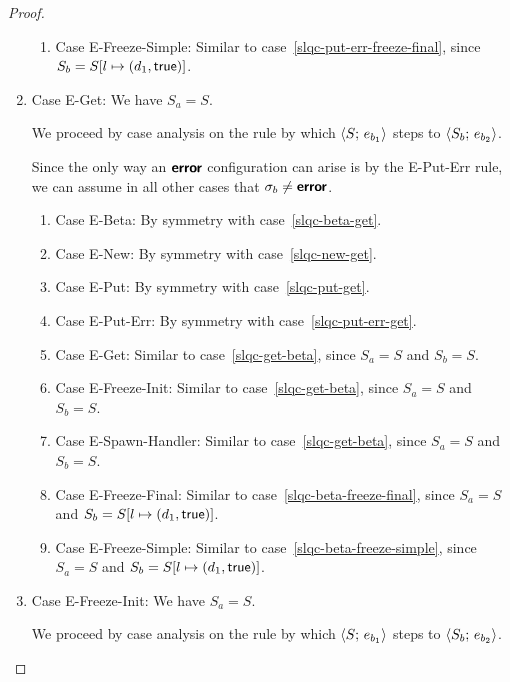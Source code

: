 \begin{proof}
\begin{enumerate}
\begin{enumerate}
    \item \label{slqc-put-err-freeze-simple}Case {\sc
      E-Freeze-Simple}: Similar to
      case~\ref{slqc-put-err-freeze-final}, since $S_b =
      S[l \mapsto (d_1, \textsf{true})]$.

    \end{enumerate}
  \item Case {\sc E-Get}: We have $S_a = S$.

    We proceed by case analysis on the rule by which
    $\langle S;\, e_{b_1} \rangle$ steps to $\langle S_b;\, e_{b_2} \rangle$.

    Since the only way an $\textbf{\textsf{error}}$ configuration can arise is by the
    {\sc E-Put-Err} rule, we can assume in all other cases that
    $\sigma_b \neq \textbf{\textsf{error}}$.
    \begin{enumerate}
    \item \label{slqc-get-beta}Case {\sc E-Beta}: By symmetry with case~\ref{slqc-beta-get}.
    \item \label{slqc-get-new}Case {\sc E-New}: By symmetry with case~\ref{slqc-new-get}.
    \item \label{slqc-get-put}Case {\sc E-Put}: By symmetry with case~\ref{slqc-put-get}.
    \item \label{slqc-get-put-err}Case {\sc E-Put-Err}: By symmetry with case~\ref{slqc-put-err-get}.
    \item \label{slqc-get-get}Case {\sc E-Get}: Similar to
      case~\ref{slqc-get-beta}, since $S_a = S$ and $S_b = S$.
    \item \label{slqc-get-freeze-init}Case {\sc E-Freeze-Init}:
      Similar to case~\ref{slqc-get-beta}, since $S_a = S$ and $S_b = S$.
    \item \label{slqc-get-spawn-handler}Case {\sc E-Spawn-Handler}:
      Similar to case~\ref{slqc-get-beta}, since $S_a = S$ and $S_b = S$.
    \item \label{slqc-get-freeze-final}Case {\sc E-Freeze-Final}:
      Similar to case~\ref{slqc-beta-freeze-final}, since $S_a = S$
      and $S_b = S[l \mapsto (d_1, \textsf{true})]$.
    \item \label{slqc-get-freeze-simple}Case {\sc E-Freeze-Simple}:
      Similar to case~\ref{slqc-beta-freeze-simple}, since $S_a = S$
      and $S_b = S[l \mapsto (d_1, \textsf{true})]$.
    \end{enumerate}

  \item Case {\sc E-Freeze-Init}: We have $S_a = S$.

    We proceed by case analysis on the rule by which
    $\langle S;\, e_{b_1} \rangle$ steps to $\langle S_b;\, e_{b_2} \rangle$.


\end{enumerate}
\end{proof}

